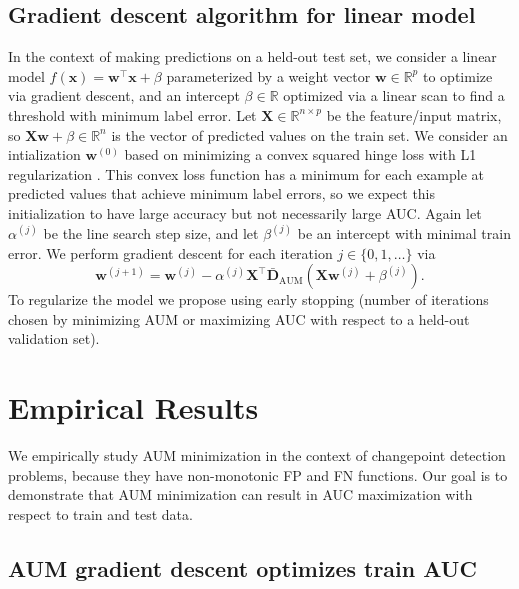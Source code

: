 \documentclass{article}
\begin{document}
\subsection{Gradient descent algorithm for linear model}
\label{sec:linear-model}
In the context of making predictions on a held-out test set, we consider a linear model $f(\mathbf x) = \mathbf w^\intercal \mathbf x + \beta$ parameterized by a weight vector $\mathbf w\in\mathbb R^p$ to optimize via gradient descent, and an intercept $\beta\in\mathbb R$ optimized via a linear scan to find a threshold with minimum label error.
Let $\mathbf X\in\mathbb R^{n\times p}$ be the feature/input matrix, so $\mathbf X \mathbf w+\beta\in\mathbb R^n$ is the vector of predicted values on the train set.
We consider an intialization $\mathbf{w}^{(0)}$ based on minimizing a convex squared hinge loss with L1 regularization \citep{Hocking2013icml}.
This convex loss function has a minimum for each example at predicted values that achieve minimum label errors, so we expect this initialization to have large accuracy but not necessarily large AUC.
Again let $\alpha^{(j)}$ be the line search step size, and let $\beta^{(j)}$ be an intercept with minimal train error.
We perform gradient descent for each iteration $j\in\{0,1,\dots\}$ via
\begin{equation}
    \mathbf{w}^{(j+1)} = \mathbf{w}^{(j)} - \alpha^{(j)}\mathbf X^\intercal \mathbf {\bar D}_\text{AUM}(\mathbf X \mathbf w^{(j)}   + \beta^{(j)}).
\end{equation}
To regularize the model we propose using early stopping (number of  iterations chosen by minimizing AUM or maximizing AUC with respect to a held-out validation set).


\section{Empirical Results}
\label{sec:results}
We empirically study AUM minimization in the context of changepoint detection problems, because they have non-monotonic FP and FN functions.
Our goal is to demonstrate that AUM minimization can result in AUC maximization with respect to train and test data.
\subsection{AUM gradient descent optimizes train AUC}
\end{document}
